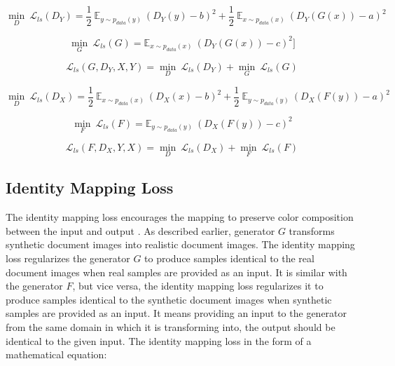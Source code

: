     \begin{equation}\label{lsgan1}
        \underset{D}{\min}\ \mathcal{L}_{ls}(D_Y) = \frac{1}{2}\ \mathbb{E}_{y \sim p_{data}(y)}\ (D_Y(y) - b)^2 + 
        \frac{1}{2}\ \mathbb{E}_{x \sim p_{data}(x)}\ (D_Y(G(x)) - a)^2
    \end{equation}
    
    \begin{equation}\label{lsgan2}
        \underset{G}{\min}\ \mathcal{L}_{ls}(G) = \mathbb{E}_{x \sim p_{data}(x)}\ (D_Y(G(x)) - c)^2]
    \end{equation}
    
    \begin{equation}\label{lsgan3}
    \mathcal{L}_{ls}(G, D_Y, X, Y) =  \underset{D}{\min}\ \mathcal{L}_{ls}(D_Y) + \underset{G}{\min}\ \mathcal{L}_{ls}(G)
    \end{equation}
    
    \begin{equation}\label{lsgan4}
        \underset{D}{\min}\ \mathcal{L}_{ls}(D_X) = \frac{1}{2}\ \mathbb{E}_{x \sim p_{data}(x)}\ (D_X(x) - b)^2 + 
        \frac{1}{2}\ \mathbb{E}_{y \sim p_{data}(y)}\ (D_X(F(y)) - a)^2
    \end{equation}
    
    \begin{equation}\label{lsgan5}        
        \underset{F}{\min}\ \mathcal{L}_{ls}(F) = \mathbb{E}_{y \sim p_{data}(y)}\ (D_X(F(y)) - c)^2
    \end{equation}
    
    
    \begin{equation}\label{lsgan6}        
        \mathcal{L}_{ls}(F, D_X, Y, X) = \underset{D}{\min}\ \mathcal{L}_{ls}(D_X) + \underset{F}{\min}\ \mathcal{L}_{ls}(F)
    \end{equation}
    



	    


\subsection{Identity Mapping Loss}

The identity mapping loss encourages the mapping to preserve color composition between the input and output \cite{taigman2016unsupervised}. As described earlier, generator $G$ transforms synthetic document images into realistic document images. The identity mapping loss regularizes the generator $G$ to produce samples identical to the real document images when real samples are provided as an input. It is similar with the generator $F$, but vice versa, the identity mapping loss regularizes it to produce samples identical to the synthetic document images when synthetic samples are provided as an input. It means providing an input to the generator from the same domain in which it is transforming into, the output should be identical to the given input. The identity mapping loss in the form of a mathematical equation:

